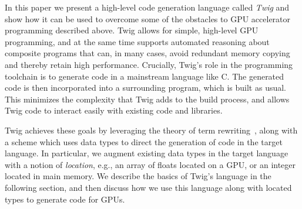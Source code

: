 In this paper we present a high-level code generation language called
\emph{Twig} and show how it can be used to overcome some of the obstacles to GPU
accelerator programming described above. Twig allows for simple, high-level GPU
programming, and at the same time supports automated reasoning about composite
programs that can, in many cases, avoid redundant memory copying and thereby
retain high performance. Crucially, Twig's role in the programming toolchain is
to generate code in a mainstream language like C. The generated code is then
incorporated into a surrounding program, which is built as usual. This minimizes
the complexity that Twig adds to the build process, and allows Twig code to
interact easily with existing code and libraries.

Twig achieves these goals by leveraging the theory of term
rewriting~\cite{baader98rewriting}, along with a scheme which uses data types to
direct the generation of code in the target language. In particular, we augment
existing data types in the target language with a notion of \emph{location},
e.g., an array of floats located on a GPU, or an integer located in main memory.
We describe the basics of Twig's language in the following section, and then
discuss how we use this language along with located types to generate code for
GPUs.



